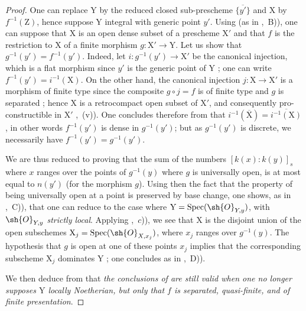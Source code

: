 \begin{proof}
One can replace $\mathrm{Y}$ by the reduced closed sub-prescheme $\overline{\{y'\}}$ and $\mathrm{X}$ by $f^{-1}(\mathrm{Z})$, hence suppose $\mathrm{Y}$ integral with generic point $y'$.
Using  (as in ,~B)), one can suppose that $\mathrm{X}$ is an open dense subset of a prescheme $\mathrm{X}'$ and that $f$ is the restriction to $\mathrm{X}$ of a finite morphism $g:\mathrm{X}'\to\mathrm{Y}$.
Let us show that $g^{-1}(y')=f^{-1}(y')$.
Indeed, let $i:g^{-1}(y')\to\mathrm{X}'$ be the canonical injection, which is a flat morphism since $y'$ is the generic point of $\mathrm{Y}$ ; one can write $f^{-1}(y')=i^{-1}(\mathrm{X})$.
On the other hand, the canonical injection $j:\mathrm{X}\to\mathrm{X}'$ is a morphism of finite type since the composite $g\circ j=f$ is of finite type and $g$ is separated ; hence $\mathrm{X}$ is a retrocompact open subset of $\mathrm{X}'$, and consequently pro-constructible in $\mathrm{X}'$ ,~(v)).
One concludes therefore from  that $i^{-1}(\overline{\mathrm{X}})=\overline{i^{-1}(\mathrm{X})}$, in other words $f^{-1}(y')$ is dense in $g^{-1}(y')$; but as $g^{-1}(y')$ is discrete, we necessarily have $f^{-1}(y')=g^{-1}(y')$.

We are thus reduced to proving that the sum of the numbers $[k(x):k(y)]_s$ where $x$ ranges over the points of $g^{-1}(y)$ where $g$ is universally open, is at most equal to
$n(y')$ (for the morphism $g$).
Using then the fact that the property of being universally open at a point is preserved by base change, one shows, as in ,~C)), that one can reduce to the case where $\mathrm{Y}=\operatorname{Spec}(\sh{O}_{Y,y})$, with $\sh{O}_{Y,y}$ \emph{strictly local}.
Applying ,~$c$)), we see that $\mathrm{X}$ is the disjoint union of the open subschemes $\mathrm{X}_j=\operatorname{Spec}(\sh{O}_{X,x_j})$, where $x_j$ ranges over $g^{-1}(y)$. The hypothesis that $g$ is open at one of these points $x_j$ implies that the corresponding subscheme $\mathrm{X}_j$ dominates $\mathrm{Y}$ ; one concludes as in ,~D)).

We then deduce from  that \emph{the conclusions of  are still valid when one no longer supposes $\mathrm{Y}$ locally Noetherian, but only that $f$ is separated, quasi-finite, and of finite presentation}.
\end{proof}

